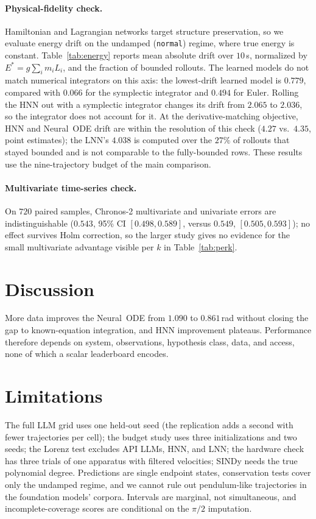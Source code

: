 \documentclass{article}
\begin{document}
\paragraph{Physical-fidelity check.}
\label{sec:energy}
Hamiltonian and Lagrangian networks target structure preservation, so we evaluate energy
drift on the undamped (\texttt{normal}) regime, where true energy is constant. Table~\ref{tab:energy}
reports mean absolute drift over $10$\,s, normalized by $E^{*}{=}g\sum_i m_i L_i$, and the
fraction of bounded rollouts. The learned models do not match numerical integrators on this
axis: the lowest-drift learned model is $0.779$, compared with $0.066$ for the symplectic
integrator and $0.494$ for Euler. Rolling the HNN out with a symplectic integrator changes
its drift from $2.065$ to $2.036$, so the integrator does not account for it. At the
derivative-matching objective, HNN and Neural~ODE drift are within the resolution of this
check ($4.27$ vs.\ $4.35$, point estimates); the LNN's $4.038$ is computed over the $27\%$ of
rollouts that stayed bounded and is not comparable to the fully-bounded rows. These results use the
nine-trajectory budget of the main comparison.

\paragraph{Multivariate time-series check.}
\label{sec:multivariate}
On $720$ paired samples, Chronos-2 multivariate and univariate errors are indistinguishable
($0.543$, 95\% CI $[0.498,0.589]$, versus $0.549$, $[0.505,0.593]$); no effect survives Holm
correction, so the larger study gives no evidence for the small multivariate advantage visible
per $k$ in Table~\ref{tab:perk}.

\section{Discussion}
More data improves the Neural~ODE from $1.090$ to $0.861$\,rad without closing the gap to
known-equation integration, and HNN improvement plateaus. Performance therefore depends on
system, observations, hypothesis class, data, and access, none of which a scalar leaderboard
encodes.

\section{Limitations}
\label{sec:limitations}
The full LLM grid uses one held-out seed (the replication adds a second with fewer trajectories
per cell); the budget study uses three initializations and two seeds; the Lorenz test excludes
API LLMs, HNN, and LNN; the hardware check has three trials of one apparatus with filtered
velocities; SINDy needs the true polynomial degree. Predictions are single endpoint states,
conservation tests cover only the undamped regime, and we cannot rule out pendulum-like
trajectories in the foundation models' corpora. Intervals are marginal, not simultaneous, and
incomplete-coverage scores are conditional on the $\pi/2$ imputation.
\end{document}
